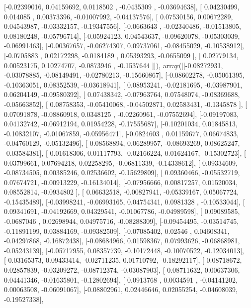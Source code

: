 \documentclass{article}
\begin{document}
       [-0.02399016,  0.04159692,  0.0118502 , -0.0435309 , -0.03694638],
       [ 0.04230499,  0.014085  ,  0.00373396, -0.01007992, -0.04137576],
       [ 0.07530156,  0.00672289,  0.04543987, -0.03332157, -0.19347556],
       [-0.0663643 , -0.02340486, -0.01513805,  0.08180248, -0.05796714],
       [-0.05924123,  0.04543637, -0.09620078, -0.05303039, -0.06991463],
       [-0.00367657, -0.06274307,  0.09737061, -0.08455029, -0.10538912],
       [-0.0705883 ,  0.02172298, -0.0184189 ,  0.05393293, -0.0655099 ],
       [ 0.02779134,  0.00523175,  0.10274707, -0.0873946 , -0.1537644 ]]), array([[-0.08272931, -0.03078885, -0.08149491, -0.02780213, -0.15660867],
       [-0.08602278, -0.05061395, -0.10363051,  0.08352539, -0.03618941],
       [ 0.08953241, -0.02181695, -0.03987901,  0.06204149, -0.09580392],
       [ 0.07438342, -0.07963764,  0.07548074, -0.08369688, -0.05663852],
       [ 0.08758353, -0.05410068, -0.04502871,  0.02583431, -0.1345878 ],
       [ 0.07091878, -0.08860918,  0.0348125 , -0.02260961, -0.07552694],
       [-0.09197083,  0.04132742, -0.06912194,  0.01954228, -0.17555687],
       [-0.10201034,  0.01845813, -0.10832107, -0.01067859, -0.05956471],
       [-0.0824603 ,  0.01159677,  0.06674833, -0.04760129, -0.05132496],
       [ 0.08568894,  0.06289957, -0.08693269,  0.08625247, -0.03584381],
       [ 0.01618306,  0.01117793, -0.02166224,  0.01624167, -0.15302723],
       [ 0.03799661,  0.07694218,  0.02258295, -0.06811339, -0.14338612],
       [ 0.09334609, -0.08734505,  0.00385246,  0.02536602, -0.15629809],
       [ 0.09360466, -0.05532719,  0.07674721, -0.00913229, -0.16134014],
       [-0.07956666,  0.00817257,  0.01520034,  0.08552814, -0.0934802 ],
       [ 0.06632518, -0.00827941, -0.05339167,  0.05067724, -0.15435489],
       [-0.03998241, -0.06993165,  0.04754341,  0.0981328 , -0.10533044],
       [ 0.09341691, -0.04192669,  0.04329541, -0.01067786, -0.04989598],
       [ 0.09089585, -0.0687046 ,  0.02698944,  0.04975716, -0.08288309],
       [-0.09454495, -0.03514745, -0.11891199,  0.03884169, -0.09382509],
       [-0.07085402,  0.02546   ,  0.04608341, -0.04297868, -0.16872438],
       [-0.08684966,  0.01598367,  0.07993626, -0.06868981, -0.05243139],
       [-0.05717955,  0.08357739, -0.10172448, -0.10070522, -0.12034013],
       [-0.03165373,  0.09433414, -0.02711235,  0.01710792, -0.18292117],
       [ 0.08718672,  0.02857839, -0.03209272, -0.08712374, -0.03087903],
       [ 0.08711632,  0.00637306,  0.04441346, -0.01635801, -0.12802694],
       [ 0.0913768 ,  0.0034591 , -0.04141202,  0.00063508, -0.06091067],
       [-0.08802961,  0.02446646,  0.02055254, -0.04608039, -0.19527338],
\end{document}
